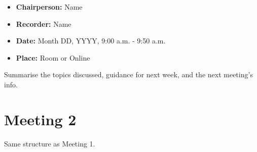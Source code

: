 \documentclass[
  12pt,
  a4paper,
]{report}
\providecommand{\tightlist}{%
  \setlength{\itemsep}{0pt}\setlength{\parskip}{0pt}}
\begin{document}
\begin{itemize}
\tightlist
\item
  \textbf{Chairperson:} Name
\item
  \textbf{Recorder:} Name
\item
  \textbf{Date:} Month DD, YYYY, 9:00 a.m. - 9:50 a.m.
\item
  \textbf{Place:} Room or Online
\end{itemize}

Summarise the topics discussed, guidance for next week, and the next
meeting's info.

\section{Meeting 2}\label{meeting-2}

Same structure as Meeting 1.
\end{document}
